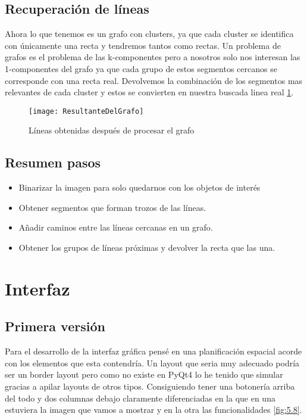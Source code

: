 \subsection{Recuperación de líneas}
Ahora lo que tenemos es un grafo con clusters, ya que cada cluster se identifica con únicamente una recta y tendremos tantos como rectas.
Un problema de grafos es el problema de las k-componentes pero a nosotros solo nos interesan las 1-componentes del grafo ya que cada grupo de estos segmentos cercanos se corresponde con una recta real.
Devolvemos la combinación de los segmentos mas relevantes de cada cluster y estos se convierten en nuestra buscada linea real \ref{fig:5.7}.
\begin{figure}[h]
\centering
\texttt{[image: ResultanteDelGrafo]}
\caption{Líneas obtenidas después de procesar el grafo}
\label{fig:5.7}
\end{figure}

\subsection{Resumen pasos}

\begin{itemize}
\item Binarizar la imagen para solo quedarnos con los objetos de interés
\item Obtener segmentos que forman trozos de las líneas.
\item Añadir caminos entre las líneas cercanas en un grafo.
\item Obtener los grupos de líneas próximas y devolver la recta que las una. 
\end{itemize}

\section{Interfaz}
\subsection{Primera versión}

Para el desarrollo de la interfaz gráfica pensé en una planificación espacial acorde con los elementos que esta contendría.
Un layout que seria muy adecuado podría ser un border layout pero como no existe en PyQt4 lo he tenido que simular gracias a apilar layouts de otros tipos.
Consiguiendo tener una botonería arriba del todo y dos columnas debajo claramente diferenciadas en la que en una estuviera la imagen que vamos a mostrar y en la otra las funcionalidades \ref{fig:5.8}.

